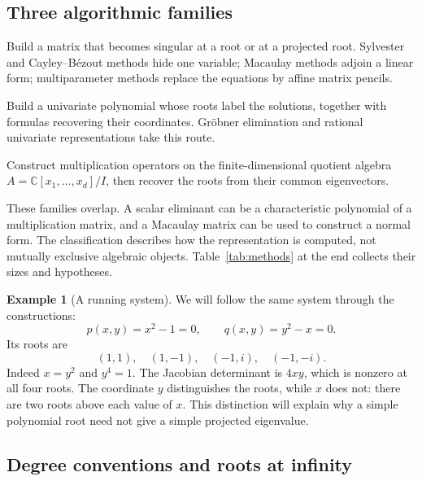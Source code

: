 \documentclass[12pt]{article}
\def\C{\mathbb{C}}
\theoremstyle{definition}
\newtheorem{example}[theorem]{Example}
\theoremstyle{remark}
\begin{document}
\subsection{Three algorithmic families}\label{sec:taxonomy}

\begin{description}[style=nextline]
  \item[Resultant and eigenvalue constructions.]
  Build a matrix that becomes singular at a root or at a projected root.
  Sylvester and Cayley--B\'ezout methods hide one variable; Macaulay methods adjoin
  a linear form; multiparameter methods replace the equations by affine matrix pencils.
  \item[Scalar elimination.]
  Build a univariate polynomial whose roots label the solutions, together with
  formulas recovering their coordinates. Gr\"obner elimination and rational univariate
  representations take this route.
  \item[Normal forms.]
  Construct multiplication operators on the finite-dimensional quotient algebra
  $A=\C[x_1,\ldots,x_d]/I$, then recover the roots from their common eigenvectors.
\end{description}

These families overlap. A scalar eliminant can be a characteristic polynomial of a
multiplication matrix, and a Macaulay matrix can be used to construct a normal form.
The classification describes how the representation is computed, not mutually exclusive
algebraic objects. Table~\ref{tab:methods} at the end collects their sizes and hypotheses.

\begin{example}[A running system]\label{ex:running}
We will follow the same system through the constructions:
\begin{equation}\label{eq:running}
  p(x,y)=x^2-1=0,\qquad q(x,y)=y^2-x=0.
\end{equation}
Its roots are
\[
  (1,1),\quad(1,-1),\quad(-1,i),\quad(-1,-i).
\]
Indeed $x=y^2$ and $y^4=1$. The Jacobian determinant is $4xy$, which is nonzero
at all four roots. The coordinate $y$ distinguishes the roots, while $x$ does not:
there are two roots above each value of $x$. This distinction will explain why a
simple polynomial root need not give a simple projected eigenvalue.
\end{example}

\subsection{Degree conventions and roots at infinity}\label{sec:degrees}
\end{document}
